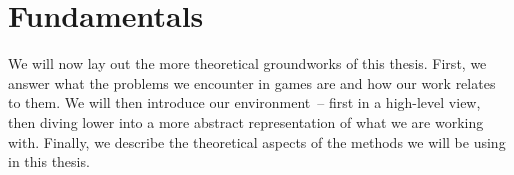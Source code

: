\section{Fundamentals}

We will now lay out the more theoretical groundworks of this thesis.
First, we answer what the problems we encounter in games are and how
our work relates to them. We will then introduce our environment~--
first in a high-level view, then diving lower into a more abstract
representation of what we are working with. Finally, we describe the
theoretical aspects of the methods we will be using in this thesis.





